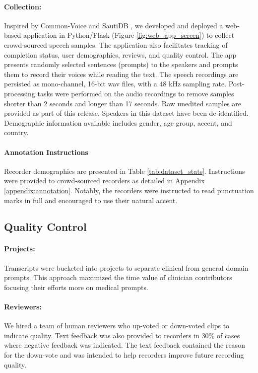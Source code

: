 \documentclass[11pt,a4paper]{article}
\begin{document}
\paragraph{Collection:} Inspired by Common-Voice \citep{ardila2019common} and SautiDB \citep{afonja2021learning}, we developed and deployed a web-based application in Python/Flask (Figure \ref{fig:web_app_screen}) to collect crowd-sourced speech samples. The application also facilitates tracking of completion status, user demographics, reviews, and quality control.  The app presents randomly selected sentences (prompts) to the speakers and prompts them to record their voices while reading the text. The speech recordings are persisted as mono-channel, 16-bit wav files, with a 48 kHz sampling rate.  Post-processing tasks were performed on the audio recordings to remove samples shorter than 2 seconds and longer than 17 seconds. Raw unedited samples are provided as part of this release. Speakers in this dataset have been de-identified. Demographic information available includes gender, age group, accent, and country.

\paragraph{Annotation Instructions} Recorder demographics are presented in Table \ref{tab:dataset_stats}. Instructions were provided to crowd-sourced recorders as detailed in Appendix \ref{appendix:annotation}. Notably, the recorders were instructed to read punctuation marks in full and encouraged to use their natural accent.


\subsection{Quality Control}

  \paragraph{Projects:} Transcripts were bucketed into projects to separate clinical from general domain prompts. This approach maximized the time value of clinician contributors focusing their efforts more on medical prompts. 
  
 \paragraph{Reviewers:} We hired a team of human reviewers who up-voted or down-voted clips to indicate quality. Text feedback was also provided to recorders in 30\% of cases where negative feedback was indicated. The text feedback contained the reason for the down-vote and was intended to help recorders improve future recording quality. %
 
\end{document}
